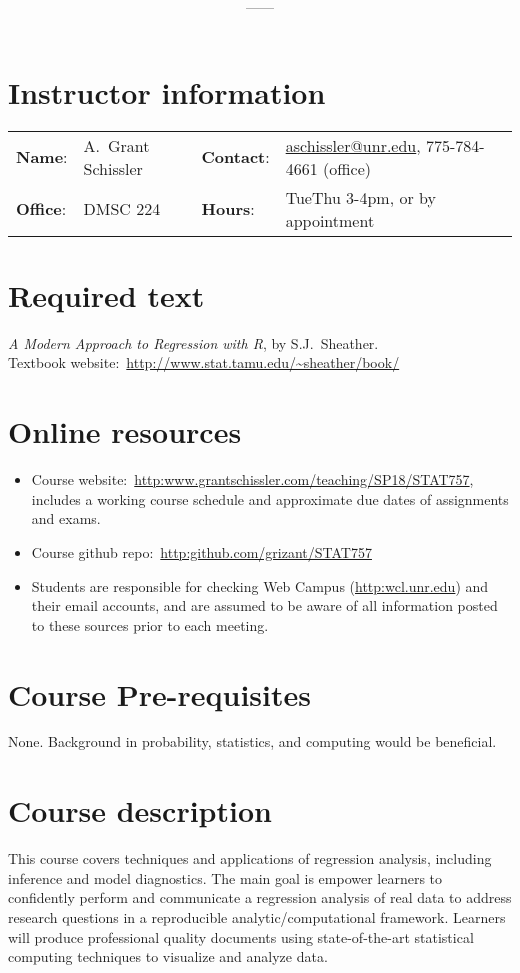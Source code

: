 \documentclass[11pt,onecolumn]{article}
\title{\textbf{\coursename}}
\author{{\semester}---{\roomnumb}---{\classtimes}}
\date{}
\makeatletter
\newcommand{\myname}{A.~Grant Schissler}
\newcommand{\myemail}{aschissler@unr.edu}
\newcommand{\office}{DMSC 224}
\newcommand{\officehours}{TueThu 3-4pm, or by appointment}
\makeatother
\begin{document}
\maketitle


\section*{Instructor information}

\begin{tabular}{llll}
\textbf{Name}:&\myname & \textbf{Contact}:&\href{mailto:\myemail}{\myemail}, 775-784-4661 (office)\\
\textbf{Office}:&\office & \textbf{Hours}:&\officehours\\
\end{tabular}

\section*{Required text}
\emph{A Modern Approach to Regression with R}, by S.J.~Sheather. \\
Textbook website:~\url{http://www.stat.tamu.edu/~sheather/book/}

\section*{Online resources}
\begin{itemize}
\item Course website:~\url{http:www.grantschissler.com/teaching/SP18/STAT757}, includes a working course schedule and approximate due dates of assignments and exams.
\item Course github repo:~\url{http:github.com/grizant/STAT757}
\item Students are responsible for checking Web Campus (\url{http:wcl.unr.edu}) and their email accounts, and are assumed to be aware of all information posted to these sources prior to each meeting.
\end{itemize}

\section*{Course Pre-requisites}
None. Background in probability, statistics, and computing would be beneficial.

\section*{Course description}
This course covers techniques and applications of regression analysis, including inference and model diagnostics. The main goal is empower learners to confidently perform and communicate a regression analysis of real data to address research questions in a reproducible analytic/computational framework. Learners will produce professional quality documents using state-of-the-art statistical computing techniques to visualize and analyze data.
\end{document}
